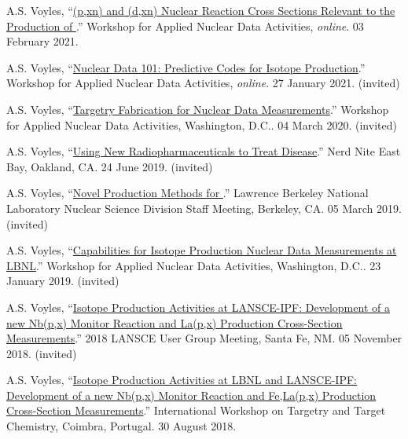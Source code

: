 \begin{bibsection}
\item A.S. Voyles, \enquote{\href{https://conferences.lbl.gov/event/504/}{(p,xn) and (d,xn)  Nuclear Reaction Cross Sections Relevant to the Production of }.} Workshop for Applied Nuclear Data Activities, \emph{online}. 03 February 2021.

\item A.S. Voyles, \enquote{\href{https://conferences.lbl.gov/event/504/}{Nuclear Data 101: Predictive Codes for Isotope Production}.} Workshop for Applied Nuclear Data Activities, \emph{online}. 27 January 2021. (invited)

\item A.S. Voyles, \enquote{\href{https://conferences.lbl.gov/event/292/}{Targetry Fabrication for Nuclear Data Measurements}.} Workshop for Applied Nuclear Data Activities, Washington, D.C.. 04 March 2020. (invited)

\item A.S. Voyles, \enquote{\href{https://eastbay.nerdnite.com/nerd-nite-624-apollo-11-recovery-oakland-art-deco-radiopharmaceuticals/}{Using New Radiopharmaceuticals to Treat Disease}.} Nerd Nite East Bay, Oakland, CA. 24 June 2019. (invited)

\item A.S. Voyles, \enquote{\href{https://conferences.lbl.gov/event/188/}{Novel Production Methods for }.} Lawrence Berkeley National Laboratory Nuclear Science Division Staff Meeting, Berkeley, CA. 05 March 2019. (invited)

\item A.S. Voyles, \enquote{\href{https://conferences.lbl.gov/event/198/}{Capabilities for Isotope Production Nuclear Data Measurements at LBNL}.} Workshop for Applied Nuclear Data Activities, Washington, D.C.. 23 January 2019. (invited)

\item A.S. Voyles, \enquote{\href{https://lansce.lanl.gov/lug2018.php}{Isotope Production Activities at LANSCE-IPF: Development of a new Nb(p,x) Monitor Reaction and La(p,x) Production Cross-Section Measurements}.} 2018 LANSCE User Group Meeting, Santa Fe, NM. 05 November 2018. (invited)

\item A.S. Voyles, \enquote{\href{https://slideslive.com/38910297/isotope-production-activities-at-lbnl-and-lansceipf-development-of-a-new-nbpx90mo-monitor-reaction-and-felapx-production-crosssection-measurements}{Isotope Production Activities at LBNL and LANSCE-IPF: Development of a new Nb(p,x) Monitor Reaction and Fe,La(p,x) Production Cross-Section Measurements}.}  International Workshop on Targetry and Target Chemistry, Coimbra, Portugal. 30 August 2018.



\end{bibsection}
